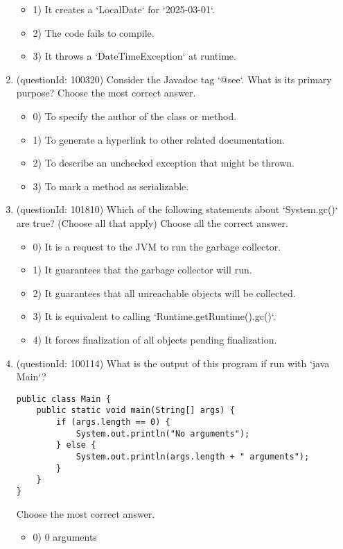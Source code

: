 \documentclass[12pt]{article}
\begin{document}
\begin{enumerate}[label=(\arabic*)]
\begin{itemize}
\item 1) It creates a `LocalDate` for `2025-03-01`.

\item 2) The code fails to compile.

\item 3) It throws a `DateTimeException` at runtime.

\end{itemize}
\item (questionId: 100320) Consider the Javadoc tag `@see`. What is its primary purpose?
Choose the most correct answer. 
\begin{itemize}
\item 0) To specify the author of the class or method.

\item 1) To generate a hyperlink to other related documentation.

\item 2) To describe an unchecked exception that might be thrown.

\item 3) To mark a method as serializable.

\end{itemize}
\item (questionId: 101810) Which of the following statements about `System.gc()` are true? (Choose all that apply)
Choose all the correct answer.\begin{itemize}
\item 0) It is a request to the JVM to run the garbage collector.

\item 1) It guarantees that the garbage collector will run.

\item 2) It guarantees that all unreachable objects will be collected.

\item 3) It is equivalent to calling `Runtime.getRuntime().gc()`.

\item 4) It forces finalization of all objects pending finalization.

\end{itemize}
\item (questionId: 100114) What is the output of this program if run with `java Main`?
\begin{verbatim}
public class Main {
    public static void main(String[] args) {
        if (args.length == 0) {
            System.out.println("No arguments");
        } else {
            System.out.println(args.length + " arguments");
        }
    }
}
\end{verbatim}
Choose the most correct answer. 
\begin{itemize}
\item 0) 0 arguments


\end{itemize}
\end{enumerate}
\end{document}
